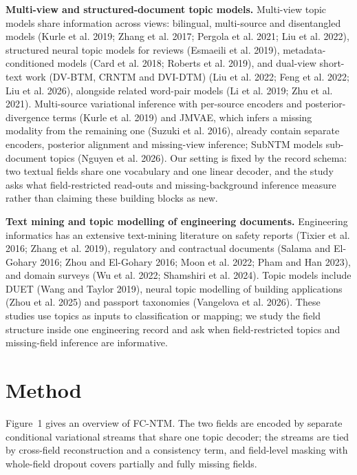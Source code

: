 \documentclass[Journal,letterpaper,NoLists]{ascelike-new}
\begin{document}
\noindent\textbf{Multi-view and structured-document topic models.} Multi-view topic models share information across views: bilingual, multi-source and disentangled
models (Kurle et al. 2019; Zhang et al. 2017; Pergola
  et al. 2021; Liu et al. 2022),
structured neural topic models for reviews (Esmaeili
  et al. 2019), metadata-conditioned
models (Card et al. 2018; Roberts et al. 2019), and dual-view short-text work (DV-BTM, CRNTM and
DVI-DTM) (Liu et al. 2022; Feng et al. 2022; Liu et al. 2026), alongside related word-pair models
(Li et al. 2019; Zhu et al. 2021). Multi-source variational inference with per-source encoders
and posterior-divergence terms (Kurle et al. 2019) and JMVAE, which infers a missing
modality from the remaining one (Suzuki et al. 2016), already contain separate encoders,
posterior alignment and missing-view inference; SubNTM models sub-document topics
(Nguyen et al. 2026). Our setting is fixed by the record schema: two textual fields share one
vocabulary and one linear decoder, and the study asks what field-restricted read-outs and
missing-background inference measure rather than claiming these building blocks as new.

\noindent\textbf{Text mining and topic modelling of engineering documents.} Engineering informatics has an extensive text-mining literature on safety reports
(Tixier et al. 2016; Zhang et al. 2019), regulatory and contractual documents
(Salama and El-Gohary 2016; Zhou and El-Gohary 2016; Moon et al. 2022; Pham and Han 2023), and domain surveys
(Wu et al. 2022; Shamshiri et al. 2024). Topic models include DUET (Wang and Taylor 2019), neural topic modelling
of building applications (Zhou et al. 2025) and passport taxonomies (Vangelova et al. 2026). These
studies use topics as inputs to classification or mapping; we study the field structure inside one
engineering record and ask when field-restricted topics and missing-field inference are
informative.

\section{Method}

Figure~1 gives an overview of FC-NTM. The two fields are encoded by separate
conditional variational streams that share one topic decoder; the streams are tied by cross-field
reconstruction and a consistency term, and field-level masking with whole-field dropout covers
partially and fully missing fields.
\end{document}
